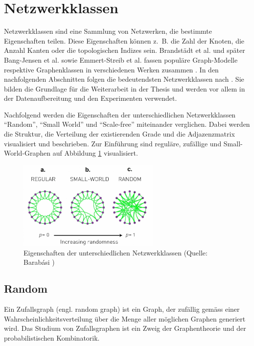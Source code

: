 \section{Netzwerkklassen} \label{sec:graph_classes}

Netzwerkklassen sind eine Sammlung von Netzwerken, die bestimmte Eigenschaften teilen.
Diese Eigenschaften können z. B. die Zahl der Knoten, die Anzahl Kanten oder die topologischen Indizes sein.
Brandstädt et al. und später Bang-Jensen et al. sowie Emmert-Streib et al. fassen populäre Graph-Modelle respektive Graphenklassen in verschiedenen Werken zusammen \cite{brandstadt_graph_1999,bang-jensen_basic_2018,emmert-streib_mathematical_2020}.
In den nachfolgenden Abschnitten folgen die bedeutendsten Netzwerkklassen nach \cite{emmert-streib_mathematical_2020}.
Sie bilden die Grundlage für die Weiterarbeit in der Thesis und werden vor allem in der Datenaufbereitung und den Experimenten verwendet.

Nachfolgend werden die Eigenschaften der unterschiedlichen Netzwerkklassen \enquote{Random}, \enquote{Small World} und \enquote{Scale-free} miteinander verglichen.
Dabei werden die Struktur, die Verteilung der existierenden Grade und die Adjazenzmatrix visualisiert und beschrieben.
Zur Einführung sind reguläre, zufällige und Small-World-Graphen auf Abbildung \ref{fig:random_scale_small} visualisiert.

\begin{figure}[H]
    \centering
    \includegraphics[width=7cm]{images/20_material_methods/barabasi_zusammenhang_smallworld_random.png}
    \caption{Eigenschaften der unterschiedlichen Netzwerkklassen (Quelle: Barabási \cite[p.~97]{barabasi_network_2016})}
    \label{fig:random_scale_small}
\end{figure}

\newpage
\subsection{Random}

Ein Zufallsgraph (engl. random graph) ist ein Graph, der zufällig gemäss einer Wahrscheinlichkeitsverteilung über die Menge aller möglichen Graphen generiert wird.
Das Studium von Zufallsgraphen ist ein Zweig der Graphentheorie und der probabilistischen Kombinatorik.

